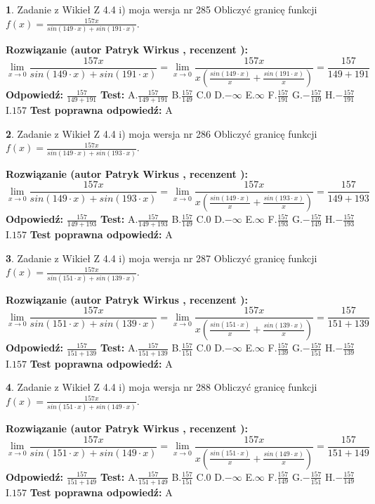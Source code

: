 \documentclass[12pt, a4paper]{article}
\theoremstyle{definition} %
\newtheorem{zad}{}
\newcommand{\zadStart}[1]{\begin{zad}#1\newline}
\newcommand{\zadStop}{\end{zad}}
\newcommand{\rozwStart}[2]{\noindent \textbf{Rozwiązanie (autor #1 , recenzent #2): }\newline}
\newcommand{\rozwStop}{\newline}
\newcommand{\odpStart}{\noindent \textbf{Odpowiedź:}\newline}
\newcommand{\odpStop}{\newline}
\newcommand{\testStart}{\noindent \textbf{Test:}\newline}
\newcommand{\testStop}{\newline}
\newcommand{\kluczStart}{\noindent \textbf{Test poprawna odpowiedź:}\newline}
\newcommand{\kluczStop}{\newline}
\begin{document}
\zadStart{Zadanie z Wikieł Z 4.4 i) moja wersja nr 285}
Obliczyć granicę funkcji $f(x)=\frac{157x}{sin(149\cdot x) +sin(191\cdot x)}$.
\zadStop
\rozwStart{Patryk Wirkus}{}
$$\lim\limits_{x\to 0}\frac{157x}{sin(149\cdot x) +sin(191\cdot x)}=\lim\limits_{x\to 0}\frac{157x}{x(\frac{sin(149\cdot x)}{x}+\frac{sin(191\cdot x)}{x})}=\frac{157}{149+191}$$
\rozwStop
\odpStart
$\frac{157}{149+191}$
\odpStop
\testStart
A.$\frac{157}{149+191}$
B.$\frac{157}{149}$
C.$0$
D.$-\infty$
E.$\infty$
F.$\frac{157}{191}$
G.$-\frac{157}{149}$
H.$-\frac{157}{191}$
I.$157$
\testStop
\kluczStart
A
\kluczStop



\zadStart{Zadanie z Wikieł Z 4.4 i) moja wersja nr 286}
Obliczyć granicę funkcji $f(x)=\frac{157x}{sin(149\cdot x) +sin(193\cdot x)}$.
\zadStop
\rozwStart{Patryk Wirkus}{}
$$\lim\limits_{x\to 0}\frac{157x}{sin(149\cdot x) +sin(193\cdot x)}=\lim\limits_{x\to 0}\frac{157x}{x(\frac{sin(149\cdot x)}{x}+\frac{sin(193\cdot x)}{x})}=\frac{157}{149+193}$$
\rozwStop
\odpStart
$\frac{157}{149+193}$
\odpStop
\testStart
A.$\frac{157}{149+193}$
B.$\frac{157}{149}$
C.$0$
D.$-\infty$
E.$\infty$
F.$\frac{157}{193}$
G.$-\frac{157}{149}$
H.$-\frac{157}{193}$
I.$157$
\testStop
\kluczStart
A
\kluczStop



\zadStart{Zadanie z Wikieł Z 4.4 i) moja wersja nr 287}
Obliczyć granicę funkcji $f(x)=\frac{157x}{sin(151\cdot x) +sin(139\cdot x)}$.
\zadStop
\rozwStart{Patryk Wirkus}{}
$$\lim\limits_{x\to 0}\frac{157x}{sin(151\cdot x) +sin(139\cdot x)}=\lim\limits_{x\to 0}\frac{157x}{x(\frac{sin(151\cdot x)}{x}+\frac{sin(139\cdot x)}{x})}=\frac{157}{151+139}$$
\rozwStop
\odpStart
$\frac{157}{151+139}$
\odpStop
\testStart
A.$\frac{157}{151+139}$
B.$\frac{157}{151}$
C.$0$
D.$-\infty$
E.$\infty$
F.$\frac{157}{139}$
G.$-\frac{157}{151}$
H.$-\frac{157}{139}$
I.$157$
\testStop
\kluczStart
A
\kluczStop



\zadStart{Zadanie z Wikieł Z 4.4 i) moja wersja nr 288}
Obliczyć granicę funkcji $f(x)=\frac{157x}{sin(151\cdot x) +sin(149\cdot x)}$.
\zadStop
\rozwStart{Patryk Wirkus}{}
$$\lim\limits_{x\to 0}\frac{157x}{sin(151\cdot x) +sin(149\cdot x)}=\lim\limits_{x\to 0}\frac{157x}{x(\frac{sin(151\cdot x)}{x}+\frac{sin(149\cdot x)}{x})}=\frac{157}{151+149}$$
\rozwStop
\odpStart
$\frac{157}{151+149}$
\odpStop
\testStart
A.$\frac{157}{151+149}$
B.$\frac{157}{151}$
C.$0$
D.$-\infty$
E.$\infty$
F.$\frac{157}{149}$
G.$-\frac{157}{151}$
H.$-\frac{157}{149}$
I.$157$
\testStop
\kluczStart
A
\kluczStop
\end{document}
